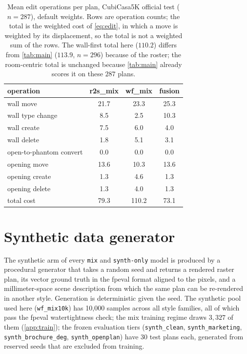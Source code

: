 \documentclass{article}
\begin{document}
\begin{table}[h]
\centering
\caption{Mean edit operations per plan, CubiCasa5K official test ($n{=}287$),
default weights. Rows are operation counts; the total is the weighted cost of
\cref{eq:edit}, in which a move is weighted by its displacement, so the total
is not a weighted sum of the rows. The wall-first total here ($110.2$) differs from
\cref{tab:main} ($113.9$, $n{=}296$) because of the roster; the room-centric
total is unchanged because \cref{tab:main} already scores it on these $287$
plans.}
\label{tab:editops}
\small
\begin{tabular}{lccc}
\toprule
operation & r2s\_mix & wf\_mix & fusion \\
\midrule
wall move            & 21.7 & 23.3 & 25.3 \\
wall type change     & 8.5  & 2.5  & 10.3 \\
wall create          & 7.5  & 6.0  & 4.0 \\
wall delete          & 1.8  & 5.1  & 3.1 \\
open-to-phantom convert & 0.0 & 0.0 & 0.0 \\
opening move         & 13.6 & 10.3 & 13.6 \\
opening create       & 1.3  & 4.6  & 1.3 \\
opening delete       & 1.3  & 4.0  & 1.3 \\
\midrule
total cost           & 79.3 & 110.2 & 73.1 \\
\bottomrule
\end{tabular}
\end{table}


\section{Synthetic data generator}\label{app:synth}
The synthetic arm of every \texttt{mix} and \texttt{synth-only} model is
produced by a procedural generator that takes a random seed and returns a
rendered raster plan, its vector ground truth in the fpeval format aligned to
the pixels, and a millimeter-space scene description from which the same plan
can be re-rendered in another style. Generation is deterministic given the
seed. The synthetic pool used here (\texttt{wf\_mix10k}) has 10{,}000
samples across all style families, all of which pass the fpeval
watertightness check; the mix training regime draws $3{,}327$ of them
(\cref{app:train}); the frozen evaluation tiers (\texttt{synth\_clean},
\texttt{synth\_marketing}, \texttt{synth\_brochure\_deg},
\texttt{synth\_openplan}) have 30 test plans each, generated from reserved
seeds that are excluded from training.
\end{document}
